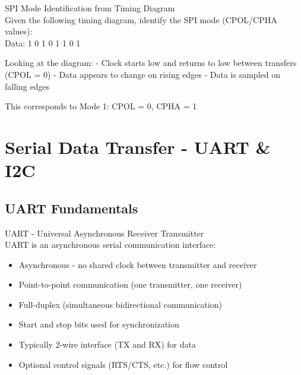 \begin{example2}{SPI Mode Identification from Timing Diagram}\\
Given the following timing diagram, identify the SPI mode (CPOL/CPHA values):
\\
Data:  1     0     1     0     1     1     0     1

\tcblower
Looking at the diagram:
- Clock starts low and returns to low between transfers (CPOL = 0)
- Data appears to change on rising edges
- Data is sampled on falling edges

This corresponds to Mode 1: CPOL = 0, CPHA = 1
\end{example2}

\section{Serial Data Transfer - UART \& I2C}

\subsection{UART Fundamentals}

\begin{concept}{UART - Universal Asynchronous Receiver Transmitter}\\
UART is an asynchronous serial communication interface:
\begin{itemize}
    \item Asynchronous - no shared clock between transmitter and receiver
    \item Point-to-point communication (one transmitter, one receiver)
    \item Full-duplex (simultaneous bidirectional communication)
    \item Start and stop bits used for synchronization
    \item Typically 2-wire interface (TX and RX) for data
    \item Optional control signals (RTS/CTS, etc.) for flow control
\end{itemize}
\end{concept}


